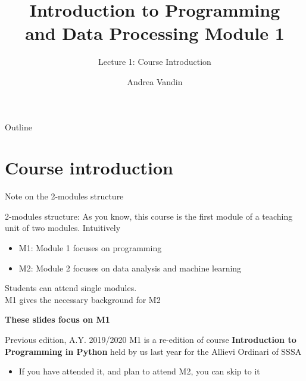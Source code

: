 \documentclass{beamer}%
\title{Introduction to Programming\\ and Data Processing Module 1
}
\subtitle{Lecture 1: Course Introduction}
\date{%
}
\begin{document}
\frame{\titlepage}
\author{Andrea Vandin}


\begin{frame}{Outline}
\tableofcontents
\end{frame}

\section{Course introduction}

\begin{frame}{Note on the 2-modules structure}
	\begin{block}{2-modules structure: \myurl{\homepage}}
		As you know, this course is the first module of a teaching unit of two modules. Intuitively
		\begin{itemize}
			\item M1: Module 1 focuses on programming
			\item M2: Module 2 focuses  on data analysis and machine learning
		\end{itemize}
		Students can attend single modules. \\ M1 gives the necessary background for M2
		\begin{center}\textbf{These slides focus on M1}\end{center}
	\end{block}	
\pause
	\begin{block}{Previous edition, A.Y. 2019/2020}
		M1 is a re-edition of course \textbf{Introduction to Programming in Python} held by us 
		last year for the Allievi Ordinari of SSSA
		\begin{itemize}
			\item If you have attended it, and plan to attend M2, you can skip to it
		\end{itemize}
	\end{block}
\end{frame}
\end{document}
